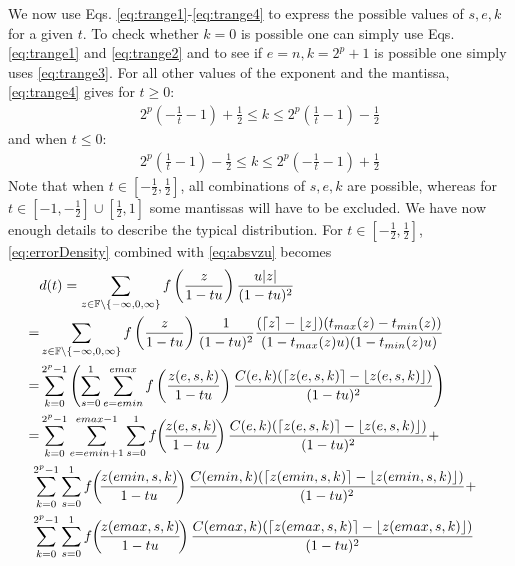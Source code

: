 \documentclass[10pt,conference]{IEEEtran}
\newcommand{\ceil}[1]{\lceil #1 \rceil}
\newcommand{\floor}[1]{\lfloor #1 \rfloor}
\newcommand{\F}{\mathbb{F}}
\newcommand{\absv}[1]{\vert #1\vert}
\begin{document}
We now use Eqs. \eqref{eq:trange1}-\eqref{eq:trange4} to express the possible values of $s,e,k$ for a given $t$. To check whether $k=0$ is possible one can simply use Eqs. \eqref{eq:trange1} and \eqref{eq:trange2} and to see if $e=n, k=2^p+1$ is possible one simply uses \eqref{eq:trange3}. For all other values of the exponent and the mantissa, \eqref{eq:trange4} gives for $t\geq 0$:
\begin{align}
2^p\left(-\frac{1}{t}-1\right)+\frac{1}{2}\leq k\leq 2^p\left(\frac{1}{t}-1\right)-\frac{1}{2}\label{eq:kfromtpos}
\end{align}
and when $t\leq 0$:
\begin{align}
2^p\left(\frac{1}{t}-1\right)-\frac{1}{2}\leq k\leq 2^p\left(-\frac{1}{t}-1\right)+\frac{1}{2}\label{eq:kfromtneg}
\end{align}
Note that when $t\in\left[-\frac{1}{2},\frac{1}{2}\right]$, all combinations of $s,e,k$ are possible, whereas for $t\in \left[-1,-\frac{1}{2}\right]\cup \left[\frac{1}{2},1\right]$ some mantissas will have to be excluded. 
We have now enough details to describe the typical distribution. For $t\in\left[-\frac{1}{2},\frac{1}{2}\right]$, \eqref{eq:errorDensity} combined with \eqref{eq:absvzu} becomes 
\footnotesize
\begin{align}
&d(t)=\sum_{z\in \F\setminus\{-\infty,0,\infty\}}f\left(\frac{z}{1-tu}\right) \frac{u\absv{z}}{(1-tu)^2}\nonumber
\\
=&\sum_{z\in \F\setminus\{-\infty,0,\infty\}}f\left(\frac{z}{1-tu}\right) \frac{1}{(1-tu)^2}\frac{(\ceil{z}-\floor{z})(t_{max}(z)-t_{min}(z))}{(1-t_{max}(z)u)(1-t_{min}(z)u)}&\nonumber
\\
=&\sum_{k=0}^{2^{p}-1}\left(\sum_{s=0}^1\sum_{e=emin}^{emax}f\left(\frac{z(e,s,k)}{1-tu}\right)\frac{C(e,k)(\ceil{z(e,s,k)}-\floor{z(e,s,k)})}{(1-tu)^2}\right)\nonumber 
\\
=&\sum_{k=0}^{2^p-1}\sum_{e=emin+1}^{emax-1}\sum_{s=0}^1 f\hspace{-2pt}\left(\hspace{-2pt}\frac{z(e,s,k)}{1-tu}\hspace{-2pt}\right)\frac{C(e,k)(\ceil{z(e,s,k)}-\floor{z(e,s,k)})}{(1-tu)^2}+ \nonumber
\\
&\hspace{-6pt} \sum_{k=0}^{2^{p}-1}\sum_{s=0}^1 f\hspace{-2pt}\left(\hspace{-2pt}\frac{z(emin,s,k)}{1-tu}\hspace{-2pt}\right)\frac{C(emin,k)(\ceil{z(emin,s,k)}-\floor{z(emin,s,k)})}{(1-tu)^2}+ \nonumber
\\
& \hspace{-6pt}\sum_{k=0}^{2^{p}-1}\sum_{s=0}^1 f\hspace{-2pt}\left(\hspace{-2pt}\frac{z(emax,s,k)}{1-tu}\hspace{-2pt}\right)\frac{C(emax,k)(\ceil{z(emax,s,k)}-\floor{z(emax,s,k)})}{(1-tu)^2}
\label{eq:pdf1/2}
\end{align}
\end{document}
